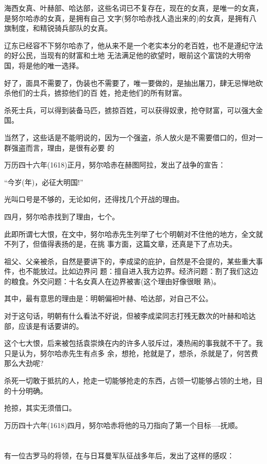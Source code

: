 \documentclass[11pt,a4paper,onecolumn]{article}
\begin{document}
海西女真、叶赫部、哈达部，这些名词已不复存在，现在的女真，是唯一的女真，是努尔哈赤的女真，是拥有自己
文字(努尔哈赤找人造出来的)的女真，是拥有八旗制度，和精锐骑兵部队的女真。

辽东已经容不下努尔哈赤了，他从来不是一个老实本分的老百姓，也不是遵纪守法的好公民，当现有的财富和土地
无法满足他的欲望时，眼前这个富饶的大明帝国，将是他的唯一选择。

好了，面具不需要了，伪装也不需要了，唯一要做的，是抽出屠刀，肆无忌惮地砍杀他们的士兵，掳掠他们的百
姓，抢走他们的所有财富。

杀死士兵，可以得到装备马匹，掳掠百姓，可以获得奴隶，抢夺财富，可以强大金国。

当然了，这些话是不能明说的，因为一个强盗，杀人放火是不需要借口的，但对一群强盗而言，理由，是很有必要
的

万历四十六年(1618)正月，努尔哈赤在赫图阿拉，发出了战争的宣告：

``今岁(年)，必征大明国!''

光叫口号是不够的，无论如何，还得找几个开战的理由。

四月，努尔哈赤找到了理由，七个。

此即所谓七大恨，在文中，努尔哈赤先生列举了七个明朝对不住他的地方，全文就不列了，但值得表扬的是，在挑
事方面，这篇文章，还真是下了点功夫。

祖父、父亲被杀，自然是要讲下的，李成梁的庇护，自然是不会提的，某些重大事件，也不能放过。比如边界问
题：擅自进入我方边界。经济问题：割了我们这边的粮食。外交问题：十名女真人在边界被害(这个理由好像很眼
熟)。

其中，最有意思的理由是：明朝偏袒叶赫、哈达部，对自己不公。

对于这句话，明朝有什么看法不好说，但被李成梁同志打残无数次的叶赫和哈达部，应该是有话要讲的。

这个七大恨，后来被包括袁崇焕在内的许多人驳斥过，凑热闹的事我就不干了。我只是认为，努尔哈赤先生有点多
余，想抢，抢就是了，想杀，杀就是了，何苦费那么大劲呢?

杀死一切敢于抵抗的人，抢走一切能够抢走的东西，占领一切能够占领的土地，目的十分明确。

抢掠，其实无须借口。

万历四十六年(1618)四月，努尔哈赤将他的马刀指向了第一个目标----抚顺。

\section[\thesection]{}

有一位古罗马的将领，在与日耳曼军队征战多年后，发出了这样的感叹：
\end{document}
